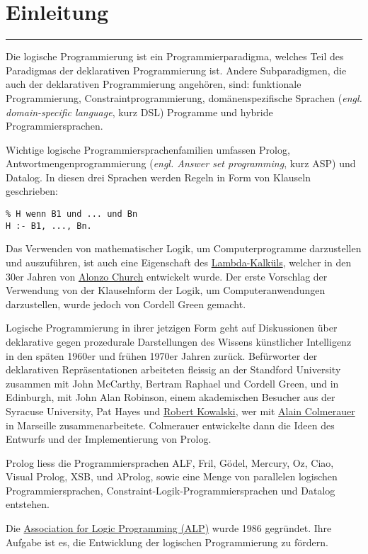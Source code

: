 \vspace*{1mm}
\section*{Einleitung}
\vspace{-10mm}
\noindent\rule{0.8\textwidth}{0.4pt}

\vspace{5mm}
\noindent
Die logische Programmierung ist ein Programmierparadigma, welches Teil des Paradigmas der deklarativen
Programmierung ist. Andere Subparadigmen, die auch der deklarativen Programmierung angehören, sind: funktionale
Programmierung, Constraintprogrammierung, domänenspezifische Sprachen (\emph{engl. domain-specific language},
kurz DSL) Programme und hybride Programmiersprachen.\par

\noindent
Wichtige logische Programmiersprachenfamilien umfassen Prolog, Antwortmengenprogrammierung (\emph{engl. Answer set
programming}, kurz ASP) und Datalog. In diesen drei Sprachen werden Regeln in Form von Klauseln geschrieben:
\begin{lstlisting}
% H wenn B1 und ... und Bn
H :- B1, ..., Bn.
\end{lstlisting}
\vspace{-8mm}
\noindent
Das Verwenden von mathematischer Logik, um Computerprogramme darzustellen und auszuführen, ist auch eine Eigenschaft
des \href{https://de.wikipedia.org/wiki/Lambda-Kalkül}{Lambda-Kalküls}, welcher in den 30er Jahren von
\href{https://de.wikipedia.org/wiki/Alonzo_Church}{Alonzo Church} entwickelt wurde. Der erste Vorschlag der Verwendung
von der Klauselnform der Logik, um Computeranwendungen darzustellen, wurde jedoch von Cordell Green \cite{cgreen} gemacht.\par

\noindent
Logische Programmierung in ihrer jetzigen Form geht auf Diskussionen über deklarative gegen prozedurale Darstellungen des
Wissens künstlicher Intelligenz in den späten 1960er und frühen 1970er Jahren zurück. Befürworter der deklarativen
Repräsentationen arbeiteten fleissig an der Standford University zusammen mit John McCarthy, Bertram Raphael und
Cordell Green, und in Edinburgh, mit John Alan Robinson, einem akademischen Besucher aus der Syracuse University, Pat Hayes
und \href{https://en.wikipedia.org/wiki/Robert_Kowalski}{Robert Kowalski}, wer mit \href{https://de.wikipedia.org/wiki/Alain_Colmerauer}{Alain Colmerauer}
in Marseille zusammenarbeitete. Colmerauer entwickelte dann die Ideen des Entwurfs und der Implementierung von Prolog.\par

\noindent
Prolog liess die Programmiersprachen ALF, Fril, Gödel, Mercury, Oz, Ciao, Visual Prolog, XSB, und $\lambda$Prolog, sowie
eine Menge von parallelen logischen Programmiersprachen, Constraint-Logik-Programmiersprachen und Datalog entstehen.\par

\noindent
Die \href{http://www.cs.nmsu.edu/ALP/the-association-for-logic-programming/alp-history/}{Association for Logic Programming (ALP)} wurde 1986 gegründet.
Ihre Aufgabe ist es, die Entwicklung der logischen Programmierung zu fördern.
